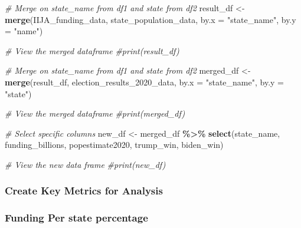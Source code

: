 \documentclass[
]{article}
\newenvironment{Shaded}{\begin{snugshade}}{\end{snugshade}}
\newcommand{\AttributeTok}[1]{\textcolor[rgb]{0.13,0.29,0.53}{#1}}
\newcommand{\CommentTok}[1]{\textcolor[rgb]{0.56,0.35,0.01}{\textit{#1}}}
\newcommand{\FunctionTok}[1]{\textcolor[rgb]{0.13,0.29,0.53}{\textbf{#1}}}
\newcommand{\NormalTok}[1]{#1}
\newcommand{\OtherTok}[1]{\textcolor[rgb]{0.56,0.35,0.01}{#1}}
\newcommand{\SpecialCharTok}[1]{\textcolor[rgb]{0.81,0.36,0.00}{\textbf{#1}}}
\newcommand{\StringTok}[1]{\textcolor[rgb]{0.31,0.60,0.02}{#1}}
\begin{document}
\begin{Shaded}
\begin{Highlighting}[]
\CommentTok{\# Merge on \textquotesingle{}state\_name\textquotesingle{} from df1 and \textquotesingle{}state\textquotesingle{} from df2}
\NormalTok{result\_df }\OtherTok{\textless{}{-}} \FunctionTok{merge}\NormalTok{(IIJA\_funding\_data, state\_population\_data, }\AttributeTok{by.x =} \StringTok{"state\_name"}\NormalTok{, }\AttributeTok{by.y =} \StringTok{"name"}\NormalTok{)}

\CommentTok{\# View the merged dataframe}
\CommentTok{\#print(result\_df)}
\end{Highlighting}
\end{Shaded}

\begin{Shaded}
\begin{Highlighting}[]
\CommentTok{\# Merge on \textquotesingle{}state\_name\textquotesingle{} from df1 and \textquotesingle{}state\textquotesingle{} from df2}
\NormalTok{merged\_df }\OtherTok{\textless{}{-}} \FunctionTok{merge}\NormalTok{(result\_df, election\_results\_2020\_data, }\AttributeTok{by.x =} \StringTok{"state\_name"}\NormalTok{, }\AttributeTok{by.y =} \StringTok{"state"}\NormalTok{)}

\CommentTok{\# View the merged dataframe}
\CommentTok{\#print(merged\_df)}
\end{Highlighting}
\end{Shaded}

\begin{Shaded}
\begin{Highlighting}[]
\CommentTok{\# Select specific columns}
\NormalTok{new\_df }\OtherTok{\textless{}{-}}\NormalTok{ merged\_df }\SpecialCharTok{\%\textgreater{}\%} \FunctionTok{select}\NormalTok{(state\_name, funding\_billions, popestimate2020, trump\_win, biden\_win)}

\CommentTok{\# View the new data frame}
\CommentTok{\#print(new\_df)}
\end{Highlighting}
\end{Shaded}

\subsubsection{Create Key Metrics for
Analysis}\label{create-key-metrics-for-analysis}

\subsubsection{Funding Per state
percentage}\label{funding-per-state-percentage}
\end{document}
